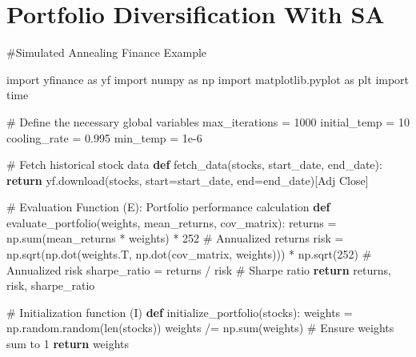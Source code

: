 \documentclass[
  letterpaper,
  DIV=11,
  numbers=noendperiod]{scrreprt}
\newenvironment{Shaded}{\begin{snugshade}}{\end{snugshade}}
\newcommand{\BuiltInTok}[1]{\textcolor[rgb]{0.00,0.23,0.31}{#1}}
\newcommand{\CommentTok}[1]{\textcolor[rgb]{0.37,0.37,0.37}{#1}}
\newcommand{\ControlFlowTok}[1]{\textcolor[rgb]{0.00,0.23,0.31}{\textbf{#1}}}
\newcommand{\DecValTok}[1]{\textcolor[rgb]{0.68,0.00,0.00}{#1}}
\newcommand{\FloatTok}[1]{\textcolor[rgb]{0.68,0.00,0.00}{#1}}
\newcommand{\ImportTok}[1]{\textcolor[rgb]{0.00,0.46,0.62}{#1}}
\newcommand{\KeywordTok}[1]{\textcolor[rgb]{0.00,0.23,0.31}{\textbf{#1}}}
\newcommand{\NormalTok}[1]{\textcolor[rgb]{0.00,0.23,0.31}{#1}}
\newcommand{\OperatorTok}[1]{\textcolor[rgb]{0.37,0.37,0.37}{#1}}
\newcommand{\StringTok}[1]{\textcolor[rgb]{0.13,0.47,0.30}{#1}}
\begin{document}

\chapter{Portfolio Diversification With
SA}\label{portfolio-diversification-with-sa}

\begin{Shaded}
\begin{Highlighting}[]
\CommentTok{\#Simulated Annealing Finance Example}

\ImportTok{import}\NormalTok{ yfinance }\ImportTok{as}\NormalTok{ yf}
\ImportTok{import}\NormalTok{ numpy }\ImportTok{as}\NormalTok{ np}
\ImportTok{import}\NormalTok{ matplotlib.pyplot }\ImportTok{as}\NormalTok{ plt}
\ImportTok{import}\NormalTok{ time}

\CommentTok{\# Define the necessary global variables}
\NormalTok{max\_iterations }\OperatorTok{=} \DecValTok{1000}
\NormalTok{initial\_temp }\OperatorTok{=} \DecValTok{10}
\NormalTok{cooling\_rate }\OperatorTok{=} \FloatTok{0.995}
\NormalTok{min\_temp }\OperatorTok{=} \FloatTok{1e{-}6}

\CommentTok{\# Fetch historical stock data}
\KeywordTok{def}\NormalTok{ fetch\_data(stocks, start\_date, end\_date):}
    \ControlFlowTok{return}\NormalTok{ yf.download(stocks, start}\OperatorTok{=}\NormalTok{start\_date, end}\OperatorTok{=}\NormalTok{end\_date)[}\StringTok{\textquotesingle{}Adj Close\textquotesingle{}}\NormalTok{]}

\CommentTok{\# Evaluation Function (E): Portfolio performance calculation}
\KeywordTok{def}\NormalTok{ evaluate\_portfolio(weights, mean\_returns, cov\_matrix):}
\NormalTok{    returns }\OperatorTok{=}\NormalTok{ np.}\BuiltInTok{sum}\NormalTok{(mean\_returns }\OperatorTok{*}\NormalTok{ weights) }\OperatorTok{*} \DecValTok{252}  \CommentTok{\# Annualized returns}
\NormalTok{    risk }\OperatorTok{=}\NormalTok{ np.sqrt(np.dot(weights.T, np.dot(cov\_matrix, weights))) }\OperatorTok{*}\NormalTok{ np.sqrt(}\DecValTok{252}\NormalTok{)  }\CommentTok{\# Annualized risk}
\NormalTok{    sharpe\_ratio }\OperatorTok{=}\NormalTok{ returns }\OperatorTok{/}\NormalTok{ risk  }\CommentTok{\# Sharpe ratio}
    \ControlFlowTok{return}\NormalTok{ returns, risk, sharpe\_ratio}

\CommentTok{\# Initialization function (I)}
\KeywordTok{def}\NormalTok{ initialize\_portfolio(stocks):}
\NormalTok{    weights }\OperatorTok{=}\NormalTok{ np.random.random(}\BuiltInTok{len}\NormalTok{(stocks))}
\NormalTok{    weights }\OperatorTok{/=}\NormalTok{ np.}\BuiltInTok{sum}\NormalTok{(weights)  }\CommentTok{\# Ensure weights sum to 1}
    \ControlFlowTok{return}\NormalTok{ weights}


\end{Highlighting}
\end{Shaded}
\end{document}
